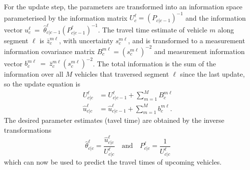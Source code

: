 For the update step, the parameters are transformed into an information
space parameterised by the information matrix $U^\ell_c = (P_{c|c-1})^{-1}$
and the information vector $u^\ell_c~=~\hat \theta^\ell_{c|c-1} (P^\ell_{c|c-1})^{-1}$.
The travel time estimate of vehicle $m$ along segment $\ell$
is $\bar z_c^{m\ell}$, with uncertainty $s^{m\ell}_c$,
and is transformed to a measurement information covariance matrix 
$B_c^{m\ell} = (s^{m\ell}_c)^{-2}$
and measurement information vector $b_c^{m\ell}~=~\bar z^{m\ell}_c (s^{m\ell}_c)^{-2}$.
The total information is the sum of the information over all $M$ vehicles
that traversed segment $\ell$ since the last update,
so the update equation is
\begin{align*}
U^\ell_{c|c} &= U^\ell_{c|c-1} + \sum_{m=1}^M B^{m\ell}_{c} \\
\hat u^\ell_{c|c} &= \hat u^\ell_{c|c-1} + \sum_{m=1}^M b^{m\ell}_{c}.
\end{align*}
The desired parameter estimates (tavel time) are obtained 
by the inverse transformations
\begin{equation*}
\hat \theta^\ell_{c|c} = \frac{\hat u^\ell_{c|c}}{U^\ell_{c|c}} 
\quad\text{and}\quad
P^\ell_{c|c} = \frac{1}{U^\ell_{c|c}}
\end{equation*}
which can now be used to predict the travel times of upcoming vehicles.



